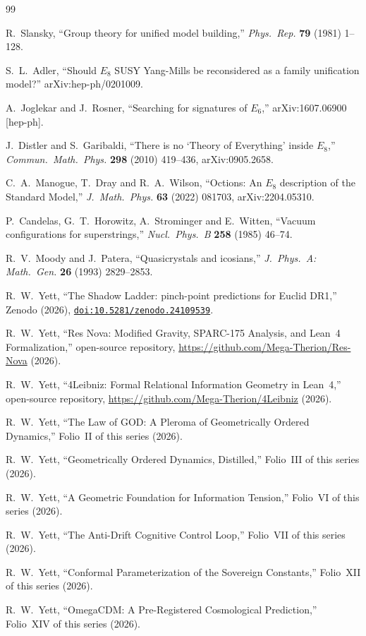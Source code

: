 \documentclass[11pt]{article}
\newcommand{\doi}[1]{\href{https://doi.org/#1}{\nolinkurl{doi:#1}}}
\begin{document}
\begin{thebibliography}{99}

 R.~Slansky, ``Group theory for unified model building,'' \textit{Phys.\ Rep.} \textbf{79} (1981) 1--128.

 S.~L.~Adler, ``Should $E_8$ SUSY Yang-Mills be reconsidered as a family unification model?'' arXiv:hep-ph/0201009.

 A.~Joglekar and J.~Rosner, ``Searching for signatures of $E_6$,'' arXiv:1607.06900 [hep-ph].

 J.~Distler and S.~Garibaldi, ``There is no `Theory of Everything' inside $E_8$,'' \textit{Commun.\ Math.\ Phys.} \textbf{298} (2010) 419--436, arXiv:0905.2658.

 C.~A.~Manogue, T.~Dray and R.~A.~Wilson, ``Octions: An $E_8$ description of the Standard Model,'' \textit{J.\ Math.\ Phys.} \textbf{63} (2022) 081703, arXiv:2204.05310.

 P.~Candelas, G.~T.~Horowitz, A.~Strominger and E.~Witten, ``Vacuum configurations for superstrings,'' \textit{Nucl.\ Phys.\ B} \textbf{258} (1985) 46--74.

 R.~V.~Moody and J.~Patera, ``Quasicrystals and icosians,'' \textit{J.\ Phys.\ A: Math.\ Gen.} \textbf{26} (1993) 2829--2853.

 R.~W.~Yett, ``The Shadow Ladder: pinch-point predictions for Euclid DR1,'' Zenodo (2026), \doi{10.5281/zenodo.24109539}.

 R.~W.~Yett, ``Res Nova: Modified Gravity, SPARC-175 Analysis, and Lean~4 Formalization,'' open-source repository, \url{https://github.com/Mega-Therion/Res-Nova} (2026).

 R.~W.~Yett, ``4Leibniz: Formal Relational Information Geometry in Lean~4,'' open-source repository, \url{https://github.com/Mega-Therion/4Leibniz} (2026).

 R.~W.~Yett, ``The Law of GOD: A Pleroma of Geometrically Ordered Dynamics,'' Folio~II of this series (2026).

 R.~W.~Yett, ``Geometrically Ordered Dynamics, Distilled,'' Folio~III of this series (2026).

 R.~W.~Yett, ``A Geometric Foundation for Information Tension,'' Folio~VI of this series (2026).

 R.~W.~Yett, ``The Anti-Drift Cognitive Control Loop,'' Folio~VII of this series (2026).

 R.~W.~Yett, ``Conformal Parameterization of the Sovereign Constants,'' Folio~XII of this series (2026).

 R.~W.~Yett, ``OmegaCDM: A Pre-Registered Cosmological Prediction,'' Folio~XIV of this series (2026).

\end{thebibliography}
\end{document}
